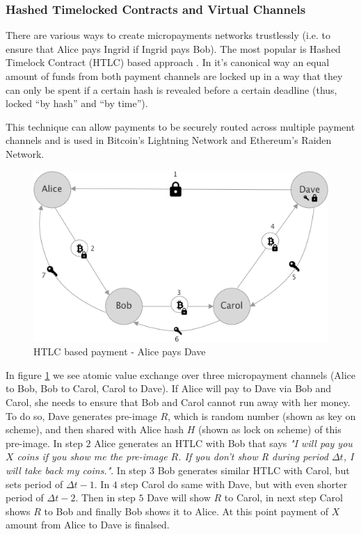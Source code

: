 \documentclass[a4paper,12pt]{article}
\begin{document}
\subsubsection{Hashed Timelocked Contracts and Virtual Channels}

There are various ways to create micropayments networks trustlessly (i.e. to 
ensure that Alice pays Ingrid if Ingrid pays Bob). The most popular is Hashed 
Timelock Contract (HTLC) based approach \cite{lightning}. In it's canonical way 
an equal amount of funds from both payment channels are locked up in a way that 
they can only be spent if a certain hash is revealed before a certain deadline 
(thus, locked “by hash” and “by time”). 

This technique can allow payments to be securely routed across multiple payment 
channels and is used in Bitcoin's Lightning Network and Ethereum's Raiden 
Network.

\begin{figure}[H]
    \centering
    \includegraphics[scale=0.5]{../img/htlc}
    \caption{HTLC based payment - Alice pays Dave}
    \label{img:htlc}
\end{figure}

In figure \ref{img:htlc} we see atomic value exchange over three micropayment 
channels (Alice to Bob, Bob to Carol, Carol to Dave). If Alice will pay to Dave
via Bob and Carol, she needs to ensure that Bob and Carol cannot run away with 
her money. To do so, Dave generates pre-image $R$, which is random number (shown 
as key on scheme), and then shared with Alice hash $H$ (shown as lock on scheme) 
of this pre-image. In step $2$ Alice generates an HTLC with Bob that says 
\textit{"I will pay you $X$ coins if you show me the pre-image $R$. If you don't 
show R during period $\Delta t$, I will take back my coins."}. In step $3$ Bob 
generates similar HTLC with Carol, but sets period of $\Delta t - 1$. In $4$ step 
Carol do same with Dave, but with even shorter period of $\Delta t - 2$. Then in 
step $5$ Dave will show $R$ to Carol, in next step Carol shows $R$ to Bob and 
finally Bob shows it to Alice. At this point payment of $X$ amount from Alice to 
Dave is finalsed.
\end{document}
